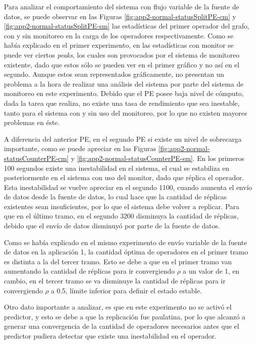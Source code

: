 Para analizar el comportamiento del sistema con flujo variable de la fuente de datos, se puede observar en las Figuras \ref{fig:app2-normal-statusSplitPE-cm} y \ref{fig:app2-normal-statusSplitPE-sm} las estadísticas del primer operador del grafo, con y sin monitoreo en la carga de los operadores respectivamente. Como se había explicado en el primer experimento, en las estadísticas con monitor se puede ver ciertos \textit{peaks}, los cuales son provocados por el sistema de monitoreo existente, dado que estos sólo se pueden ver en el primer gráfico y no así en el segundo. Aunque estos sean representados gráficamente, no presentan un problema a la hora de realizar una análisis del sistema por parte del sistema de monitoreo en este experimento. Debido que el PE posee baja nivel de cómputo, dada la tarea que realiza, no existe una tasa de rendimiento que sea inestable, tanto para el sistema con y sin uso del monitoreo, por lo que no existen mayores problemas en éste.

A diferencia del anterior PE, en el segundo PE si existe un nivel de sobrecarga importante, como se puede apreciar en las Figuras \ref{fig:app2-normal-statusCounterPE-cm} y \ref{fig:app2-normal-statusCounterPE-sm}. En los primeros 100 segundos existe una inestabilidad en el sistema, el cual se estabiliza en posteriormente en el sistema con uso del monitor, dado que réplica el operador. Esta inestabilidad se vuelve apreciar en el segundo 1100, cuando aumenta el envío de datos desde la fuente de datos, lo cual hace que la cantidad de réplicas existentes sean insuficientes, por lo que el sistema debe volver a replicar. Para que en el último tramo, en el segundo 3200 disminuya la cantidad de réplicas, debido que el envío de datos disminuyó por parte de la fuente de datos.

Como se había explicado en el mismo experimento de envío variable de la fuente de datos en la aplicación 1, la cantidad óptima de operadores en el primer tramo es distinta a la del tercer tramo. Esto se debe a que en el primer tramo van aumentando la cantidad de réplicas para ir convergiendo $\rho$ a un valor de 1, en cambio, en el tercer tramo se va disminuye la cantidad de réplicas para ir convergiendo $\rho$ a 0.5, límite inferior para definir el estado estable.

Otro dato importante a analizar, es que en este experimento no se activó el predictor, y esto se debe a que la replicación fue paulatina, por lo que alcanzó a generar una convergencia de la cantidad de operadores necesarios antes que el predictor pudiera detectar que existe una inestabilidad en el operador.


